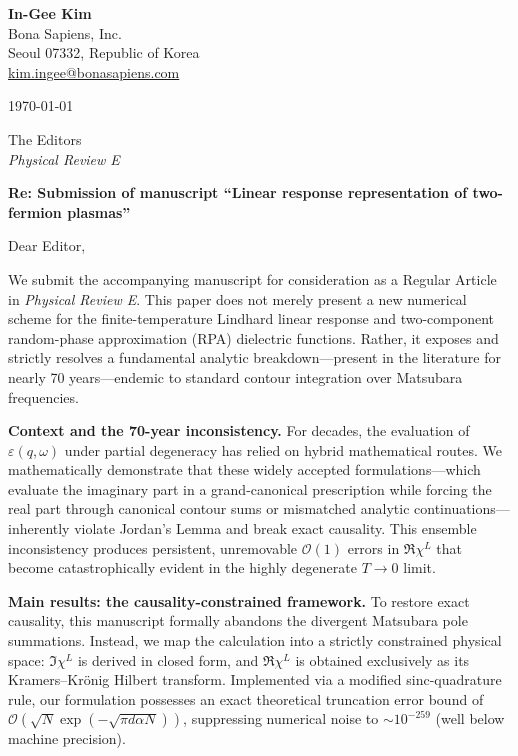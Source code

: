 \documentclass[11pt]{article}
\begin{document}
\noindent
\textbf{In-Gee Kim}\\
Bona Sapiens, Inc.\\
Seoul 07332, Republic of Korea\\
\href{mailto:kim.ingee@bonasapiens.com}{kim.ingee@bonasapiens.com}

\vspace{1em}
\noindent\today

\vspace{1em}
\noindent
The Editors\\
\textit{Physical Review E}

\vspace{1em}
\noindent
\textbf{Re: Submission of manuscript ``Linear response representation of two-fermion plasmas''}

\vspace{0.5em}
Dear Editor,

We submit the accompanying manuscript for consideration as a Regular Article in \textit{Physical Review E}.
This paper does not merely present a new numerical scheme for the finite-temperature Lindhard linear response and two-component random-phase approximation (RPA) dielectric functions.
Rather, it exposes and strictly resolves a fundamental analytic breakdown---present in the literature for nearly 70 years---endemic to standard contour integration over Matsubara frequencies.

\textbf{Context and the 70-year inconsistency.}
For decades, the evaluation of $\varepsilon(q,\omega)$ under partial degeneracy has relied on hybrid mathematical routes.
We mathematically demonstrate that these widely accepted formulations---which evaluate the imaginary part in a grand-canonical prescription while forcing the real part through canonical contour sums or mismatched analytic continuations---inherently violate Jordan's Lemma and break exact causality.
This ensemble inconsistency produces persistent, unremovable $\mathcal{O}(1)$ errors in $\Re\chi^L$ that become catastrophically evident in the highly degenerate $T \to 0$ limit.

\textbf{Main results: the causality-constrained framework.}
To restore exact causality, this manuscript formally abandons the divergent Matsubara pole summations.
Instead, we map the calculation into a strictly constrained physical space: $\Im\chi^L$ is derived in closed form, and $\Re\chi^L$ is obtained exclusively as its Kramers--Kr\"onig Hilbert transform.
Implemented via a modified sinc-quadrature rule, our formulation possesses an exact theoretical truncation error bound of $\mathcal{O}(\sqrt{N} \exp(-\sqrt{\pi d \alpha N}))$, suppressing numerical noise to $\sim 10^{-259}$ (well below machine precision).
\end{document}
